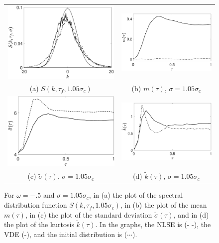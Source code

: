 \documentclass[a4paper,11pt]{article}
\begin{document}
\begin{figure}[!ht]
\centering
\begin{tabular}{cc}
\includegraphics[width=60mm, height=39mm]{pdf_w_nhf_ep_pt05_Nens_512_sig0_1pt05} & \includegraphics[width=.48\textwidth]{mean_w_nhf_ep_pt05_Nens_512_sig0_1pt05} \\
(a) $S(k,\tau_{f},1.05\sigma_{c})$ & (b) $m(\tau)$, $\sigma = 1.05\sigma_{c}$\\
\includegraphics[width=.48\textwidth]{std_w_nhf_ep_pt05_Nens_512_sig0_1pt05} & \includegraphics[width=.48\textwidth]{kts_w_nhf_ep_pt05_Nens_512_sig0_1pt05} \\
(c) $\tilde{\sigma}(\tau)$, $\sigma = 1.05\sigma_{c}$ & (d) $\tilde{k}(\tau)$, $\sigma = 1.05\sigma_{c}$\\
\end{tabular}
\caption{For $\omega=-.5$ and $\sigma=1.05 \sigma_{c}$, in (a) the plot of the spectral distribution function $S(k,\tau_{f},1.05\sigma_{c})$, in (b) the plot of the mean $m(\tau)$, in (c) the plot of the standard deviation $\tilde{\sigma}(\tau)$, and in (d) the plot of the kurtosis $\tilde{k}(\tau)$.  In the graphs, the NLSE is (- -), the VDE (-), and the initial distribution is ($\cdots$).}
\label{fig:stbleomnh}
\end{figure}
\end{document}
